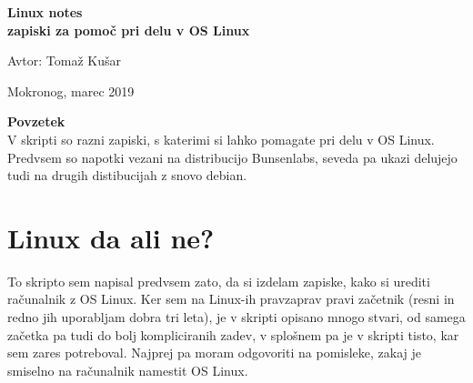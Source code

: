 \documentclass[12pt,a4paper,twoside]{article}
\begin{document}
\baselineskip 19pt \thispagestyle{empty}

\begin{center}
{\Huge\bf Linux notes}\\
[1cm] {\large \bf zapiski za pomoč pri delu v OS Linux}\\



\begin{figure}[h!] \centering
{}
\end{figure}


 Avtor: Tomaž Kušar


Mokronog, marec 2019\linebreak 

\begin{figure}[h!] \centering
{}
\end{figure}

\end{center}
\clearpage \setcounter{page}{2}
\newpage


\noindent \textbf{Povzetek}\\
V skripti so razni zapiski, s katerimi si lahko pomagate pri delu v OS Linux. Predvsem so napotki vezani na distribucijo Bunsenlabs, seveda pa ukazi delujejo tudi na drugih distibucijah z snovo debian.


\newpage

\tableofcontents
\newpage
\pagestyle{fancy}
\renewcommand{\sectionmark}[1]{\markright{T. Kušar. Delam z Linux-om }}
\renewcommand{\subsectionmark}[1]{\markright{T. Kušar. Delam z Linux-om }}
\renewcommand{\subsubsectionmark}[1]{\markright{T. Kušar. Delam z Linux-om }}

\section{Linux da ali ne?}
To skripto sem napisal predvsem zato, da si izdelam zapiske, kako si urediti računalnik z OS Linux. Ker sem  na Linux-ih pravzaprav pravi začetnik (resni in redno jih uporabljam dobra tri leta), je v skripti opisano mnogo stvari, od samega začetka pa tudi do bolj kompliciranih zadev, v splošnem pa je v skripti tisto, kar sem zares potreboval. Najprej pa moram odgovoriti na pomisleke, zakaj je smiselno na računalnik namestit OS Linux.
\end{document}
